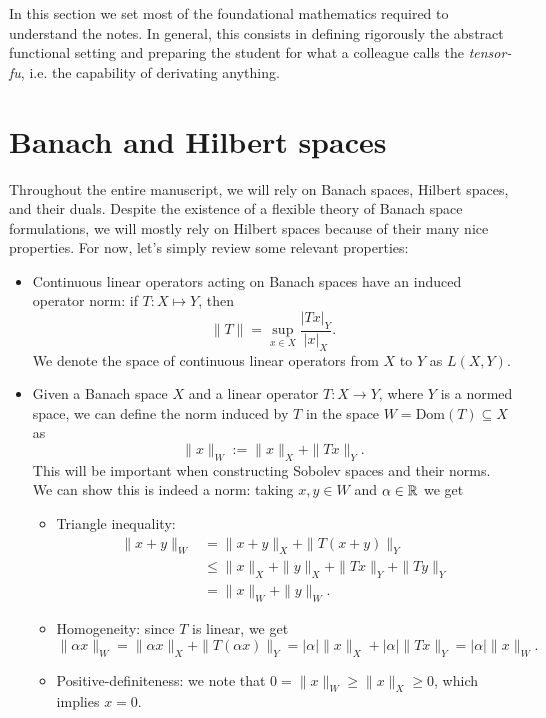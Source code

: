 In this section we set most of the foundational mathematics required to understand the notes. In general, this consists in defining rigorously the abstract functional setting and preparing the student for what a colleague calls the \emph{tensor-fu}, i.e. the capability of derivating anything. 

\section{Banach and Hilbert spaces}
Throughout the entire manuscript, we will rely on Banach spaces, Hilbert spaces, and their duals. Despite the existence of a flexible theory of Banach space formulations, we will mostly rely on Hilbert spaces because of their many nice properties. For now, let's simply review some relevant properties: 
    \begin{itemize}
        \item Continuous linear operators acting on Banach spaces have an induced operator norm: if $T: X\mapsto Y$, then 
        $$ \| T\| =  \sup_{x\in X}\frac{|Tx|_Y}{|x|_X}. $$
        We denote the space of continuous linear operators from $X$ to $Y$ as $L(X,Y)$. 
        \item Given a Banach space $X$ and a linear operator $T:X\to Y$, where $Y$ is a normed space, we can define the norm induced by $T$ in the space $W=\text{Dom}(T)\subseteq X$ as
        $$ \|x\|_{W} := \|x\|_X + \|Tx\|_Y. $$
        This will be important when constructing Sobolev spaces and their norms. We can show this is indeed a norm: taking $x,y\in W$ and $\alpha\in \mathbb{R}$ we get
        \begin{itemize}
            \item Triangle inequality:
            \begin{align*}
                \|x+y\|_W &= \|x+y\|_X + \|T(x+y)\|_Y \\
                &\leq \|x\|_X + \|y\|_X + \|Tx\|_Y + \|Ty\|_Y \tag{$\|\cdot\|_X$ and $\|\cdot\|_Y$ are norms}\\
                &= \|x\|_W + \|y\|_W.
            \end{align*}
            \item Homogeneity: since $T$ is linear, we get 
            $$\|\alpha x\|_W = \|\alpha x\|_X + \|T(\alpha x)\|_Y = |\alpha|\|x\|_X + |\alpha|\|Tx\|_Y = |\alpha|\|x\|_W.$$
            \item Positive-definiteness: we note that $0=\|x\|_W\geq \|x\|_X\geq 0$, which implies $x=0$.
        \end{itemize}

\end{itemize}
